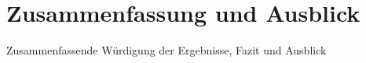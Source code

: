 \chapter{Zusammenfassung und Ausblick}
Zusammenfassende Würdigung der Ergebnisse, Fazit und Ausblick